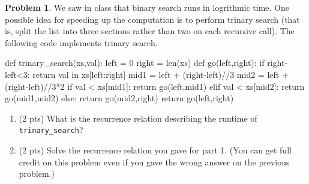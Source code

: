 \documentclass[12pt]{article}
\theoremstyle{definition}
\newtheorem{problem}{Problem}
\begin{document}
\newpage
\begin{problem}
    We saw in class that binary search runs in logrithmic time.
    One possible idea for speeding up the computation is to perform trinary search
    (that is, split the list into three sections rather than two on each recursive call).
    The following code implements trinary search.
\begin{python}
def trinary_search(xs,val):
    left = 0
    right = len(xs)
    def go(left,right):
        if right-left<3:
            return val in xs[left:right]
        mid1 = left + (right-left)//3
        mid2 = left + (right-left)//3*2
        if val < xs[mid1]:
            return go(left,mid1)
        elif val < xs[mid2]:
            return go(mid1,mid2)
        else:
            return go(mid2,right)
    return go(left,right)
\end{python}

    \begin{enumerate}
        \item
            (2 pts)
            What is the recurrence relation describing the runtime of \texttt{trinary\_search}?

        \newpage
        \item
            (2 pts)
            Solve the recurrence relation you gave for part 1.
            (You can get full credit on this problem even if you gave the wrong answer on the previous problem.)
    \end{enumerate}
\end{problem}
\end{document}
